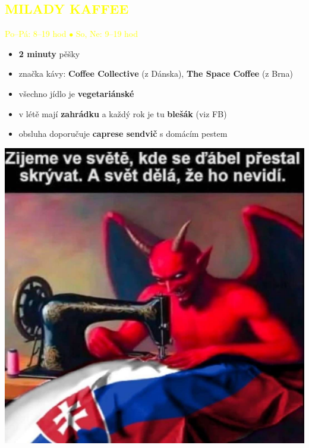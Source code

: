 \documentclass{article}
\newcommand{\podnadpisy}[1]{
  \subsection*{\textcolor{yellow}{#1}}
}
\begin{document}
\noindent
\begin{minipage}{0.7\textwidth}
  \podnadpisy{MILADY KAFFEE}
  \textcolor{yellow}{Po--Pá: 8--19 hod $\bullet$ So, Ne: 9--19 hod}
  \small
  \begin{itemize}[leftmargin=10pt]
    \item \textbf{2 minuty} pěšky
    \item značka kávy: \textbf{Coffee Collective} (z Dánska), \textbf{The Space Coffee} (z Brna)
    \item všechno jídlo je \textbf{vegetariánské}
    \item v létě mají \textbf{zahrádku} a každý rok je tu \textbf{blešák} (viz FB)
    \item obsluha doporučuje \textbf{caprese sendvič} s domácím pestem
  \end{itemize}
\end{minipage}
\hfill
\begin{minipage}{0.27\textwidth}
  \includegraphics[width=\linewidth]{dulezite.jpg}
\end{minipage}
\\
\end{document}
